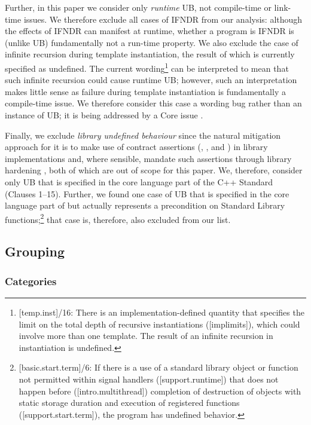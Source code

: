 Further, in this paper we consider only \emph{runtime} UB, not compile-time or link-time issues. We therefore exclude all cases of IFNDR from our analysis: although the effects of IFNDR can manifest at runtime, whether a program is IFNDR is (unlike UB) fundamentally not a run-time property.
We also exclude the case of infinite recursion during template instantiation, the result of which is currently specified as undefined. The current wording\footnote{[temp.inst]/16: There is an implementation-defined quantity that specifies the limit on the total depth of recursive instantiations ([implimits]), which could involve more than one template. The result of an infinite recursion in instantiation is undefined.} can be interpreted to mean that such infinite recursion could cause runtime UB; however, such an interpretation makes little sense as failure during template instantiation is fundamentally a compile-time issue. We therefore consider this case a wording bug rather than an instance of UB; it is being addressed by a Core issue \cite{CWG3034}.

Finally, we exclude \emph{library undefined behaviour} since the natural mitigation approach for it is to make use of contract assertions (, , and ) in library implementations and, where sensible, mandate such assertions through library hardening \cite{P3471R4}, both of which are out of scope for this paper. We, therefore, consider only UB that is specified in the core language part of the C++ Standard (Clauses 1--15). Further, we found one case of UB that is specified in the core language part of \cite{N5008} but actually represents a precondition on Standard Library functions;\footnote{[basic.start.term]/6: If there is a use of a standard library object or function not permitted within signal handlers ([support.runtime]) that does not happen before ([intro.multithread]) completion of destruction of objects with static storage duration and execution of  registered functions ([support.start.term]), the program has undefined behavior.}
that case is, therefore, also excluded from our list.


\subsection{Grouping}


\subsubsection{Categories}
\label{categories}

